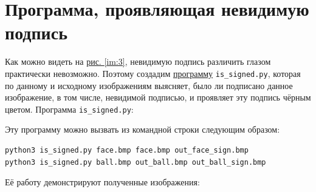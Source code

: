 \documentclass[12pt,a4paper]{scrartcl}
\begin{document}
\section{Программа, проявляющая невидимую подпись}
Как можно видеть на \hyperref[im:3]{рис. \ref*{im:3}}, невидимую подпись различить глазом практически невозможно.
Поэтому создадим \hyperref[issign]{программу} \texttt{is\_signed.py}, которая по данному и исходному изображениям выясняет, было ли подписано данное изображение, в том числе, невидимой подписью, и проявляет эту подпись чёрным цветом.
\newpage
\vspace*{-0.5cm}
Программа \texttt{is\_signed.py}: 

Эту программу можно вызвать из командной строки следующим образом:
\begin{lstlisting}
python3 is_signed.py face.bmp face.bmp out_face_sign.bmp
python3 is_signed.py ball.bmp out_ball.bmp out_ball_sign.bmp
\end{lstlisting}
Её работу демонстрируют полученные изображения:
\end{document}
